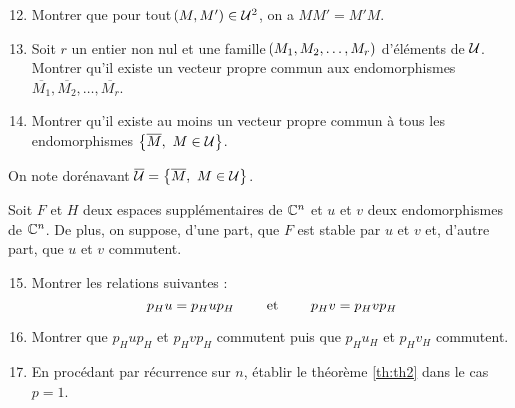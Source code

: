 \documentclass[a4paper,french,bookmarks]{article}
\begin{document}
    \begin{enumerate}
        \setcounter{enumi}{11}
        \item \label{qu:12} Montrer que pour tout $\!\left(M, M'\right) \in \mathcal{U}^2$, on a $MM' = M'M$.
        
        
        \item Soit $r$ un entier non nul et une famille $\!\left(M_1, M_2, \dots, M_r\right)$ d'éléments de $\mathcal{U}$. Montrer qu'il existe un vecteur propre commun aux endomorphismes $\overline{M_1}, \overline{M_2}, \dots, \overline{M_r}$.
        
        
        \item Montrer qu'il existe au moins un vecteur propre commun à tous les endomorphismes $\left\{\overline M,\ M \in \mathcal{U}\right\}$.
        
    \end{enumerate}
    
    On note dorénavant $\overline {\mathcal{U}} = \left\{\overline M,\ M \in \mathcal{U}\right\}$.\medskip
    
    Soit $F$ et $H$ deux espaces supplémentaires de $\mathbb{C}^n$ et $u$ et $v$ deux endomorphismes de $\mathbb{C}^n$. De plus, on suppose, d'une part, que $F$ est stable par $u$ et $v$ et, d'autre part, que $u$ et $v$ commutent.
    
    \begin{enumerate}
        \setcounter{enumi}{14}
        \item Montrer les relations suivantes :
        \[ p_H u = p_H u p_H \qquad\ \text{et} \ \qquad p_H v = p_H v p_H\]
        
        \item Montrer que $p_H u p_H$ et $p_H v p_H$ commutent puis que $p_H u_H$ et $p_H v_H$ commutent.
        
        \item\label{qu:17} En procédant par récurrence sur $n$, établir le théorème {\sffamily\ref{th:th2}} dans le cas $p=1$.
    \end{enumerate}
\end{document}
